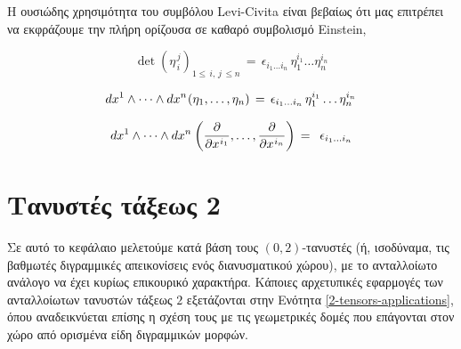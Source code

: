 \documentclass[11pt,a4paper,twoside,openright]{book}
\begin{document}
\noindent
Η ουσιώδης χρησιμότητα του συμβόλου Levi-Civita είναι βεβαίως ότι μας επιτρέπει να εκφράζουμε την πλήρη ορίζουσα σε καθαρό συμβολισμό Einstein,

\begin{equation}\label{eq:levi-civita-essential}
\det \left(\eta_{\,i}^{\,j}\right)_{1 \le\, i,\, j\, \le n}
\,
=
\,
\epsilon_{i_1 \dots i_n}\,\eta_1^{i_1} \dots \eta_n^{i_n}
\end{equation}

\begin{equation}\label{eq:levi-civita-expansion}
dx^1 \wedge \dots \wedge dx^n \hspace{.5pt}
(\eta_1, \dots, \eta_n)
\,
=
\,
\epsilon_{i_1 \dots i_n}
\,\eta_1^{i_1} \dots \eta_n^{i_n}
\end{equation}

\begin{equation}\label{eq:levi-civita-expansion-elementary}
dx^1 \wedge \dots \wedge dx^n \hspace{.5pt}
\left(\frac{\partial}{\partial x^{\hspace{.5pt}i_1}}, \dots, \frac{\partial}{\partial x^{\hspace{.5pt}i_n}}\right)
\,
=
\,
\,\,\epsilon_{i_1 \dots i_n}
\end{equation}


\chapter{Τανυστές τάξεως 2}
	\label{chapter:2-tensors}

Σε αυτό το κεφάλαιο μελετούμε κατά βάση τους $(0,2)$-τανυστές (ή, ισοδύναμα, τις βαθμωτές διγραμμικές απεικονίσεις ενός διανυσματικού χώρου), με το ανταλλοίωτο ανάλογο να έχει κυρίως επικουρικό χαρακτήρα.
Κάποιες αρχετυπικές εφαρμογές των ανταλλοίωτων τανυστών τάξεως  $2$ εξετάζονται στην Ενότητα \ref{2-tensors-applications}, όπου αναδεικνύεται επίσης η σχέση τους με τις γεωμετρικές δομές που επάγονται στον χώρο από ορισμένα είδη διγραμμικών μορφών.
\end{document}
